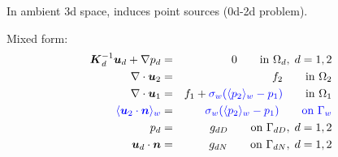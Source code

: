 In ambient 3d space, induces point sources (0d-2d problem).
  
  Mixed form:
  \begin{eqnarray}
\mathbf{\boldsymbol{K}}_d^{-1}\mathbf{\boldsymbol{u}}_d + \nabla p_d &=& 0 \qquad \textrm{in } \Omega_d,\; d=1,2  \\
\nabla \cdot \mathbf{\boldsymbol{u}}_2 &=& f_2 \qquad \textrm{in } \Omega_2\\
\nabla \cdot \mathbf{\boldsymbol{u}}_1 &=& f_1 + {\color{blue}\sigma_w(\langle p_2\rangle_w-p_1)}\qquad \textrm{in } \Omega_1\\
\color{blue}\langle\mathbf{\boldsymbol{u}}_2 \cdot \mathbf{\boldsymbol{n}}\rangle_w &=& \color{blue}\sigma_w (\langle p_2\rangle_w - p_{1}) \qquad \textrm{on } \Gamma_w\\
p_d &=& g_{dD} \qquad \textrm{on } \Gamma_{dD},\; d=1,2 \\
\mathbf{\boldsymbol{u}}_d \cdot \mathbf{\boldsymbol{n}} &=& g_{dN} \qquad \textrm{on } \Gamma_{dN},\; d=1,2
  \end{eqnarray}



  
 

